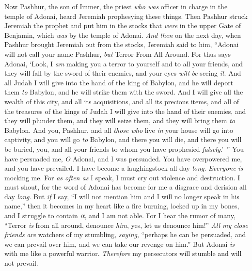 \begin{biblechapter} %
 Now Pashhur, the son of Immer, the priest \textit{who was} officer in charge in the temple of Adonai, heard Jeremiah prophesying these things.
\verse Then Pashhur struck Jeremiah the prophet and put him in the stocks that \textit{were} in the upper Gate of Benjamin, which \textit{was} by the temple of Adonai.
\verse \textit{And then} on the next day, when Pashhur brought Jeremiah out from the stocks, Jeremiah said to him, “Adonai will not call your name Pashhur, \textit{but} Terror From All Around.
\verse For thus says Adonai, ‘Look, I \textit{am} making you a terror to yourself and to all your friends, and they will fall by the sword of their enemies, and your eyes \textit{will be} seeing \textit{it}. And all Judah I will give into the hand of the king of Babylon, and he will deport them \textit{to} Babylon, and he will strike them with the sword.
\verse And I will give all the wealth of this city, and all its acquisitions, and all its precious items, and all of the treasures of the kings of Judah I will give into the hand of their enemies, and they will plunder them, and they will seize them, and they will bring them \textit{to} Babylon.
\verse And you, Pashhur, and all \textit{those who} live \textit{in} your house will go into captivity, and you will go \textit{to} Babylon, and there you will die, and there you will be buried, you, and all your friends to whom you have prophesied \textit{falsely}.’ ”
 You have persuaded me, \textit{O} Adonai, and I was persuaded. 
You have overpowered me, and you have prevailed. 
I have become a laughingstock all day \textit{long}. 
\textit{Everyone} \textit{is} mocking me.
\verse For \textit{as often as} I speak, 
I must cry out violence and destruction. 
I must shout, for the word of Adonai has become for me 
a disgrace and derision all day \textit{long}.
\verse But \textit{if} I say, “I will not mention him 
and I will no longer speak in his name,” 
then it becomes in my heart like a fire burning, 
locked up in my bones, 
and I struggle to contain \textit{it}, 
and I am not able.
\verse For I hear the rumor of many, 
“Terror \textit{is} from all around, denounce \textit{him}, 
yes, let us denounce him!” 
\textit{All my close friends} \textit{are} watchers of my stumbling, 
\textit{saying}, “perhaps he can be persuaded, 
and we can prevail over him, 
and we can take our revenge on him.”
\verse But Adonai \textit{is} with me like a powerful warrior. 
\textit{Therefore} my persecutors will stumble and will not prevail. 

\end{biblechapter}
